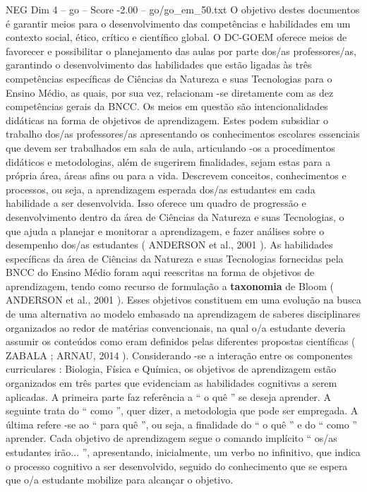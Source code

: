 \begin{textsample}{NEG Dim 4 – go – Score -2.00 – go/go\_em\_50.txt}
O objetivo destes documentos é garantir meios para o desenvolvimento das competências e habilidades em um contexto social, ético, crítico e científico global.
O DC-GOEM oferece meios de favorecer e possibilitar o planejamento das aulas por parte dos/as professores/as, garantindo o desenvolvimento das habilidades que estão ligadas às três competências específicas de Ciências da Natureza e suas Tecnologias para o Ensino Médio, as quais, por sua vez, relacionam -se diretamente com as dez competências gerais da BNCC.
Os meios em questão são intencionalidades didáticas na forma de objetivos de aprendizagem.
Estes podem subsidiar o trabalho dos/as professores/as apresentando os conhecimentos escolares essenciais que devem ser trabalhados em sala de aula, articulando -os a procedimentos didáticos e metodologias, além de sugerirem finalidades, sejam estas para a própria área, áreas afins ou para a vida.
Descrevem conceitos, conhecimentos e processos, ou seja, a aprendizagem esperada dos/as estudantes em cada habilidade a ser desenvolvida.
Isso oferece um quadro de progressão e desenvolvimento dentro da área de Ciências da Natureza e suas Tecnologias, o que ajuda a planejar e monitorar a aprendizagem, e fazer análises sobre o desempenho dos/as estudantes ( ANDERSON et al., 2001 ).
As habilidades específicas da área de Ciências da Natureza e suas Tecnologias fornecidas pela BNCC do Ensino Médio foram aqui reescritas na forma de objetivos de aprendizagem, tendo como recurso de formulação a \textbf{taxonomia} de Bloom ( ANDERSON et al., 2001 ).
Esses objetivos constituem em uma evolução na busca de uma alternativa ao modelo embasado na aprendizagem de saberes disciplinares organizados ao redor de matérias convencionais, na qual o/a estudante deveria assumir os conteúdos como eram definidos pelas diferentes propostas científicas ( ZABALA ; ARNAU, 2014 ).
Considerando -se a interação entre os componentes curriculares : Biologia, Física e Química, os objetivos de aprendizagem estão organizados em três partes que evidenciam as habilidades cognitivas a serem aplicadas.
A primeira parte faz referência a “ o quê ” se deseja aprender.
A seguinte trata do “ como ”, quer dizer, a metodologia que pode ser empregada.
A última refere -se ao “ para quê ”, ou seja, a finalidade do “ o quê ” e do “ como ” aprender.
Cada objetivo de aprendizagem segue o comando implícito “ os/as estudantes irão... ”, apresentando, inicialmente, um verbo no infinitivo, que indica o processo cognitivo a ser desenvolvido, seguido do conhecimento que se espera que o/a estudante mobilize para alcançar o objetivo.

\end{textsample}
